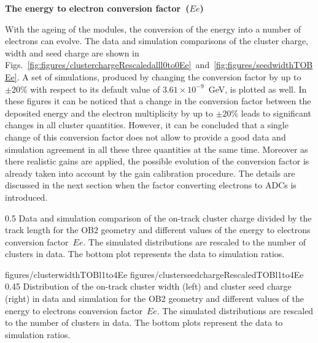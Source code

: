 \textbf{The energy to electron conversion factor~($Ee$)}

With the ageing of the modules, the conversion of the energy into a number of electrons can evolve. The data and simulation comparisons of the cluster charge, width and seed charge are shown in Figs.~\ref{fig:figures/clusterchargeRescaledalll0to0Ee}~and~\ref{fig:figures/seedwidthTOBEe}. A set of simulations, produced by changing the conversion factor by up to $\pm 20\%$ with respect to its default value of $3.61 \times 10^{-9}$~GeV, is plotted as well. In these figures it can be noticed that a change in the conversion factor between the deposited energy and the electron multiplicity by up to $\pm 20\%$ leads to significant changes in all cluster quantities. However, it can be concluded that a single change of this conversion factor does not allow to provide a good data and simulation agreement in all these three quantities at the same time. Moreover as there realistic gains are applied, the possible evolution of the conversion factor is already taken into account by the gain calibration procedure. The details are discussed in the next section when the factor converting electrons to ADCs is introduced.

                 {0.5}       %
                 { Data and simulation comparison of the on-track cluster charge divided by the track length for the OB2 geometry and different values of the energy to electrons conversion factor~$Ee$. The simulated distributions are rescaled to the number of clusters in data.  The bottom plot represents the data to simulation ratios. }

                 {figures/clusterwidthTOBl1to4Ee}
                 {figures/clusterseedchargeRescaledTOBl1to4Ee} %
                 {0.45}       %
                 { Distribution of the on-track cluster width (left) and cluster seed charge (right) in data and simulation for the OB2 geometry and different values of the energy to electrons conversion factor~$Ee$.  The simulated distributions are rescaled to the number of clusters in data.  The bottom plots represent the data to simulation ratios. }


